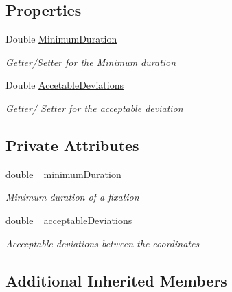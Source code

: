 \subsection*{Properties}
\begin{DoxyCompactItemize}
\item 
Double \hyperlink{class_web_analyzer_1_1_models_1_1_algorithm_model_1_1_distance_algorithm_a6dbf956e238fe79191f05d4461ca3a20}{Minimum\+Duration}
\begin{DoxyCompactList}\small\item\em Getter/\+Setter for the Minimum duration \end{DoxyCompactList}\item 
Double \hyperlink{class_web_analyzer_1_1_models_1_1_algorithm_model_1_1_distance_algorithm_abb27c8690d9554003d172ae39f454110}{Accetable\+Deviations}
\begin{DoxyCompactList}\small\item\em Getter/ Setter for the acceptable deviation \end{DoxyCompactList}\end{DoxyCompactItemize}
\subsection*{Private Attributes}
\begin{DoxyCompactItemize}
\item 
double \hyperlink{class_web_analyzer_1_1_models_1_1_algorithm_model_1_1_distance_algorithm_a46a88e251cce797e2419069e89c230c8}{\+\_\+minimum\+Duration}
\begin{DoxyCompactList}\small\item\em Minimum duration of a fixation \end{DoxyCompactList}\item 
double \hyperlink{class_web_analyzer_1_1_models_1_1_algorithm_model_1_1_distance_algorithm_a7f289300724ab5185b5a68b4f0894b62}{\+\_\+acceptable\+Deviations}
\begin{DoxyCompactList}\small\item\em Accecptable deviations between the coordinates \end{DoxyCompactList}\end{DoxyCompactItemize}
\subsection*{Additional Inherited Members}



